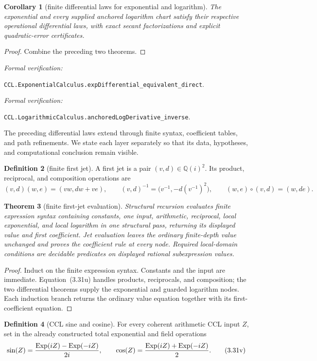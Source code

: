 \documentclass[10pt]{article}
\newtheorem{theorem}{Theorem}[section]
\newtheorem{corollary}[theorem]{Corollary}
\theoremstyle{definition}
\newtheorem{definition}[theorem]{Definition}
\theoremstyle{remark}
\newcommand{\Qi}{\mathbb{Q}(i)}
\newcommand{\leanref}[1]{\par\smallskip\noindent
  \emph{Formal verification:}\par\nobreak
  {\raggedright\nolinkurl{#1}.\par}}
\begin{document}
\begin{corollary}[finite differential laws for exponential and logarithm]
\label{thm:finite-differential-laws}
The exponential and every supplied anchored logarithm chart satisfy their
respective operational differential laws, with exact secant factorizations
and explicit quadratic-error certificates.
\end{corollary}

\begin{proof}
Combine the preceding two theorems.
\end{proof}

\leanref{CCL.ExponentialCalculus.expDifferential_equivalent_direct}
\leanref{CCL.LogarithmicCalculus.anchoredLogDerivative_inverse}

The preceding differential laws extend through finite syntax, coefficient
tables, and path refinements.  We state each layer separately so that its
data, hypotheses, and computational conclusion remain visible.

\begin{definition}[finite first jet]
A first jet is a pair $(v,d)\in\Qi^2$.  Its product, reciprocal, and
composition operations are
\[
 (v,d)(w,e)=(vw,dw+ve),
 \qquad
 (v,d)^{-1}=\bigl(v^{-1},-d(v^{-1})^2\bigr),
 \qquad
 (w,e)\circ(v,d)=(w,de).
 \tag{3.31u}
\]
\end{definition}

\begin{theorem}[finite first-jet evaluation]
Structural recursion evaluates finite expression syntax containing constants,
one input, arithmetic, reciprocal, local exponential, and local logarithm in
one structural pass, returning its displayed value and first coefficient.
Jet evaluation leaves the ordinary finite-depth value unchanged and proves
the coefficient rule at every node.  Required local-domain conditions are
decidable predicates on displayed rational subexpression values.
\end{theorem}

\begin{proof}
Induct on the finite expression syntax.  Constants and the input are
immediate.  Equation~(3.31u) handles products, reciprocals, and composition;
the two differential theorems supply the exponential and guarded logarithm
nodes.  Each induction branch returns the ordinary value equation together
with its first-coefficient equation.
\end{proof}

\begin{definition}[CCL sine and cosine]
For every coherent arithmetic CCL input $Z$, set
in the already constructed total exponential and field operations
\[
 \sin(Z)={\operatorname{Exp}(iZ)-\operatorname{Exp}(-iZ)\over2i},\qquad
 \cos(Z)={\operatorname{Exp}(iZ)+\operatorname{Exp}(-iZ)\over2}.
 \tag{3.31v}
\]
\end{definition}
\end{document}
